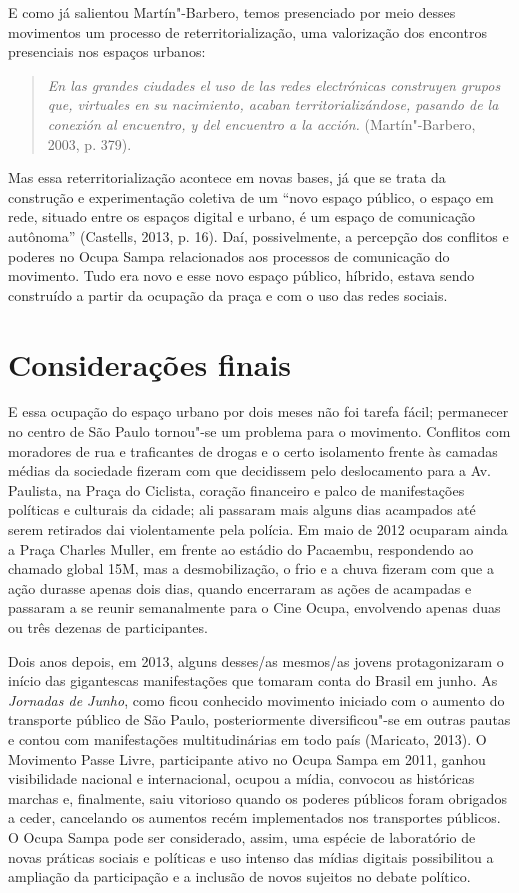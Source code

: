 E como já salientou Martín"-Barbero, temos presenciado por meio desses
movimentos um processo de reterritorialização, uma valorização dos
encontros presenciais nos espaços urbanos:

\begin{quote}
\emph{En las grandes ciudades el uso de las redes electrónicas
construyen grupos que, virtuales en su nacimiento, acaban
territorializándose, pasando de la conexión al encuentro, y del
encuentro a la acción.} (Martín"-Barbero, 2003, p. 379).
\end{quote}

Mas essa reterritorialização acontece em novas bases, já que se trata da
construção e experimentação coletiva de um ``novo espaço público, o
espaço em rede, situado entre os espaços digital e urbano, é um espaço
de comunicação autônoma'' (Castells, 2013, p. 16). Daí, possivelmente, a
percepção dos conflitos e poderes no Ocupa Sampa relacionados aos
processos de comunicação do movimento. Tudo era novo e esse novo espaço
público, híbrido, estava sendo construído a partir da ocupação da praça
e com o uso das redes sociais.

\section{Considerações finais}

E essa ocupação do espaço urbano por dois meses não foi tarefa fácil;
permanecer no centro de São Paulo tornou"-se um problema para o
movimento. Conflitos com moradores de rua e traficantes de drogas e o
certo isolamento frente às camadas médias da sociedade fizeram com que
decidissem pelo deslocamento para a Av. Paulista, na Praça do Ciclista,
coração financeiro e palco de manifestações políticas e culturais da
cidade; ali passaram mais alguns dias acampados até serem retirados dai
violentamente pela polícia. Em maio de 2012 ocuparam ainda a Praça
Charles Muller, em frente ao estádio do Pacaembu, respondendo ao chamado
global 15M, mas a desmobilização, o frio e a chuva fizeram com que a
ação durasse apenas dois dias, quando encerraram as ações de acampadas e
passaram a se reunir semanalmente para o Cine Ocupa, envolvendo apenas
duas ou três dezenas de participantes.

Dois anos depois, em 2013, alguns desses/as mesmos/as jovens
protagonizaram o início das gigantescas manifestações que tomaram conta
do Brasil em junho. As \emph{Jornadas de Junho}, como ficou conhecido
movimento iniciado com o aumento do transporte público de São Paulo,
posteriormente diversificou"-se em outras pautas e contou com
manifestações multitudinárias em todo país (Maricato, 2013). O Movimento
Passe Livre, participante ativo no Ocupa Sampa em 2011, ganhou
visibilidade nacional e internacional, ocupou a mídia, convocou as
históricas marchas e, finalmente, saiu vitorioso quando os poderes
públicos foram obrigados a ceder, cancelando os aumentos recém
implementados nos transportes públicos. O Ocupa Sampa pode ser
considerado, assim, uma espécie de laboratório de novas práticas sociais
e políticas e uso intenso das mídias digitais possibilitou a ampliação
da participação e a inclusão de novos sujeitos no debate político.

